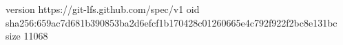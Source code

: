 version https://git-lfs.github.com/spec/v1
oid sha256:659ac7d681b390853ba2d6efcf1b170428c01260665e4c792f922f2bc8e131bc
size 11068
